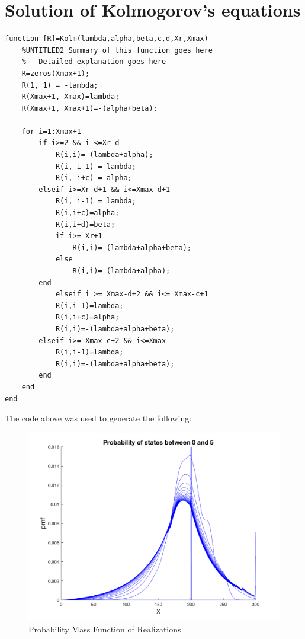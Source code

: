 \documentclass[]{article}
\begin{document}
\section{Solution of Kolmogorov’s equations}
\begin{lstlisting}
function [R]=Kolm(lambda,alpha,beta,c,d,Xr,Xmax)
	%UNTITLED2 Summary of this function goes here
	%   Detailed explanation goes here
	R=zeros(Xmax+1);
	R(1, 1) = -lambda;
	R(Xmax+1, Xmax)=lambda;
	R(Xmax+1, Xmax+1)=-(alpha+beta);
	
	for i=1:Xmax+1
		if i>=2 && i <=Xr-d
			R(i,i)=-(lambda+alpha);
			R(i, i-1) = lambda;
			R(i, i+c) = alpha;
		elseif i>=Xr-d+1 && i<=Xmax-d+1
			R(i, i-1) = lambda;
			R(i,i+c)=alpha;
			R(i,i+d)=beta;
			if i>= Xr+1
				R(i,i)=-(lambda+alpha+beta);
			else
				R(i,i)=-(lambda+alpha);
		end
			elseif i >= Xmax-d+2 && i<= Xmax-c+1
			R(i,i-1)=lambda;
			R(i,i+c)=alpha;
			R(i,i)=-(lambda+alpha+beta);
		elseif i>= Xmax-c+2 && i<=Xmax
			R(i,i-1)=lambda;
			R(i,i)=-(lambda+alpha+beta);
		end  
	end
end
\end{lstlisting}
The code above was used to generate the following: 
\begin{figure}[!ht]
	\centering
	\includegraphics[width=0.7\linewidth]{figures/pmf}
	\caption{Probability Mass Function of Realizations}
	\label{fig:pmf}
\end{figure}
\pagebreak
\end{document}
